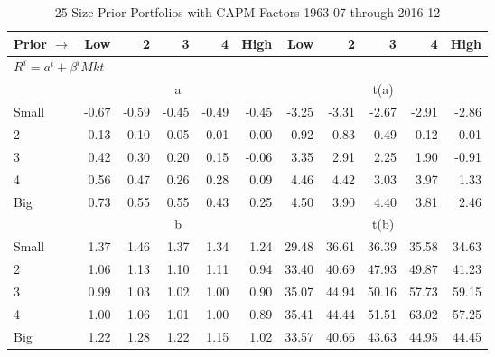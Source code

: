 
\begin{table}[!ht]
\centering
\caption{25-Size-Prior Portfolios with CAPM Factors 1963-07 through 2016-12}
\begin{tabular}{lrrrrrrrrrr}
  \toprule
    Prior $\rightarrow$ & Low & 2 & 3 & 4 & High & Low & 2 & 3 & 4 & High \\ 
  \midrule
  \multicolumn{11}{l}{$R^i=a^i+\beta^iMkt$} \\

  
    
      & \multicolumn{5}{c}{a} & \multicolumn{5}{c}{t(a)}
    
    \\
      \cmidrule(r){2-6} \cmidrule(r){7-11}

    Small   & -0.67  & -0.59  & -0.45  & -0.49  & -0.45  & -3.25  & -3.31  & -2.67  & -2.91  & -2.86  \\
         2  & 0.13  & 0.10  & 0.05  & 0.01  & 0.00  & 0.92  & 0.83  & 0.49  & 0.12  & 0.01  \\
         3  & 0.42  & 0.30  & 0.20  & 0.15  & -0.06  & 3.35  & 2.91  & 2.25  & 1.90  & -0.91  \\
         4  & 0.56  & 0.47  & 0.26  & 0.28  & 0.09  & 4.46  & 4.42  & 3.03  & 3.97  & 1.33  \\
    Big     & 0.73  & 0.55  & 0.55  & 0.43  & 0.25  & 4.50  & 3.90  & 4.40  & 3.81  & 2.46  \\

  
    
      & \multicolumn{5}{c}{b} & \multicolumn{5}{c}{t(b)}
    
    \\
      \cmidrule(r){2-6} \cmidrule(r){7-11}

    Small   & 1.37  & 1.46  & 1.37  & 1.34  & 1.24  & 29.48  & 36.61  & 36.39  & 35.58  & 34.63  \\
         2  & 1.06  & 1.13  & 1.10  & 1.11  & 0.94  & 33.40  & 40.69  & 47.93  & 49.87  & 41.23  \\
         3  & 0.99  & 1.03  & 1.02  & 1.00  & 0.90  & 35.07  & 44.94  & 50.16  & 57.73  & 59.15  \\
         4  & 1.00  & 1.06  & 1.01  & 1.00  & 0.89  & 35.41  & 44.44  & 51.51  & 63.02  & 57.25  \\
    Big     & 1.22  & 1.28  & 1.22  & 1.15  & 1.02  & 33.57  & 40.66  & 43.63  & 44.95  & 44.45  \\

  

  \bottomrule
\end{tabular}
\label{tbl:25_Size_Prior_CAPM}
\end{table}